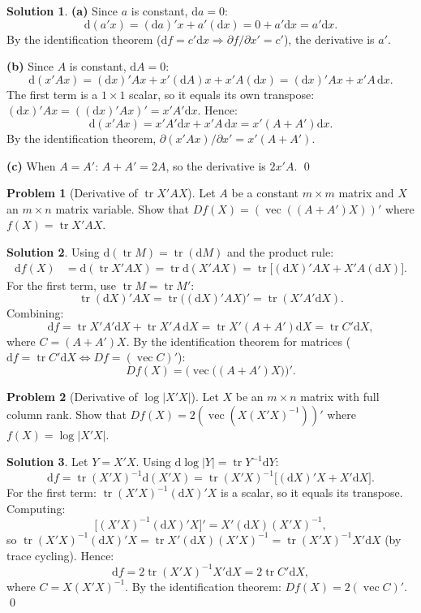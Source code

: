 \documentclass[12pt,a4paper]{article}
\theoremstyle{definition}
\newtheorem{exercise}{Problem}
\newtheorem*{solution*}{Solution}
\DeclareMathOperator\tr{tr}
\DeclareMathOperator{\avec}{vec}
\newcommand{\dd}{\mathrm{d}}
\begin{document}
\begin{solution*}
\textbf{(a)} Since $a$ is constant, $\dd a = 0$:
\[
\dd(a'x) = (\dd a)'x + a'(\dd x) = 0 + a'\dd x = a'\dd x.
\]
By the identification theorem ($\dd f = c'\dd x \Rightarrow \partial f/\partial x' = c'$), the derivative is $a'$.

\textbf{(b)} Since $A$ is constant, $\dd A = 0$:
\[
\dd(x'Ax) = (\dd x)'Ax + x'(\dd A)x + x'A(\dd x) = (\dd x)'Ax + x'A\,\dd x.
\]
The first term is a $1 \times 1$ scalar, so it equals its own transpose: $(\dd x)'Ax = ((\dd x)'Ax)' = x'A'\dd x$. Hence:
\[
\dd(x'Ax) = x'A'\dd x + x'A\,\dd x = x'(A + A')\dd x.
\]
By the identification theorem, $\partial(x'Ax)/\partial x' = x'(A+A')$.

\textbf{(c)} When $A = A'$: $A + A' = 2A$, so the derivative is $2x'A$. \qed
\end{solution*}

\begin{exercise}[Derivative of $\tr X'AX$]\label{mc:B3}
Let $A$ be a constant $m \times m$ matrix and $X$ an $m \times n$ matrix variable. Show that $Df(X) = (\avec((A+A')X))'$ where $f(X) = \tr X'AX$.
\end{exercise}

\begin{solution*}
Using $\dd(\tr M) = \tr(\dd M)$ and the product rule:
\begin{align*}
\dd f(X) &= \dd(\tr X'AX) = \tr\dd(X'AX) = \tr\bigl[(\dd X)'AX + X'A(\dd X)\bigr].
\end{align*}
For the first term, use $\tr M = \tr M'$:
\[
\tr(\dd X)'AX = \tr\bigl((\dd X)'AX\bigr)' = \tr(X'A'\dd X).
\]
Combining:
\[
\dd f = \tr X'A'\dd X + \tr X'A\,\dd X = \tr X'(A+A')\dd X = \tr C'\dd X,
\]
where $C = (A+A')X$. By the identification theorem for matrices ($\dd f = \tr C'\dd X \Leftrightarrow Df = (\avec C)'$):
\[
Df(X) = \bigl(\avec\bigl((A+A')X\bigr)\bigr)'. \tag*{\qed}
\]
\end{solution*}

\begin{exercise}[Derivative of $\log|X'X|$]\label{mc:B4}
Let $X$ be an $m \times n$ matrix with full column rank. Show that $Df(X) = 2(\avec(X(X'X)^{-1}))'$ where $f(X) = \log|X'X|$.
\end{exercise}

\begin{solution*}
Let $Y = X'X$. Using $\dd\log|Y| = \tr Y^{-1}\dd Y$:
\[
\dd f = \tr(X'X)^{-1}\dd(X'X) = \tr(X'X)^{-1}\bigl[(\dd X)'X + X'\dd X\bigr].
\]
For the first term: $\tr(X'X)^{-1}(\dd X)'X$ is a scalar, so it equals its transpose. Computing:
\[
\bigl[(X'X)^{-1}(\dd X)'X\bigr]' = X'(\dd X)(X'X)^{-1},
\]
so $\tr(X'X)^{-1}(\dd X)'X = \tr X'(\dd X)(X'X)^{-1} = \tr(X'X)^{-1}X'\dd X$ (by trace cycling). Hence:
\[
\dd f = 2\tr(X'X)^{-1}X'\dd X = 2\tr C'\dd X,
\]
where $C = X(X'X)^{-1}$. By the identification theorem: $Df(X) = 2(\avec C)'$. \qed
\end{solution*}
\end{document}

